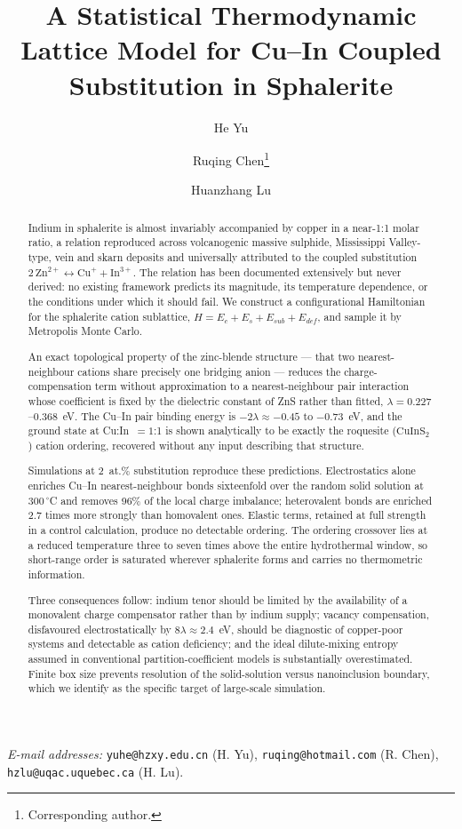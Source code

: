 \documentclass[11pt,a4paper]{article}
\title{\bfseries A Statistical Thermodynamic Lattice Model for
Cu--In Coupled Substitution in Sphalerite}
\author[1]{He Yu}
\author[2]{Ruqing Chen\thanks{Corresponding author.}}
\author[3]{Huanzhang Lu}
\affil[1]{Geological Laboratory, Hezhou University, Hezhou, Guangxi 542899, China}
\affil[2]{GUT Geoservice Inc., Montreal, Quebec, Canada}
\affil[3]{D\'epartement des sciences appliqu\'ees et Centre d'\'etudes sur les
ressources min\'erales, Universit\'e du Qu\'ebec \`a Chicoutimi, Quebec, Canada}
\date{}
\begin{document}
\maketitle

\noindent\small
\textit{E-mail addresses:} \texttt{yuhe@hzxy.edu.cn} (H. Yu),
\texttt{ruqing@hotmail.com} (R. Chen), \texttt{hzlu@uqac.uquebec.ca} (H. Lu).
\normalsize


\begin{abstract}
\noindent
Indium in sphalerite is almost invariably accompanied by copper in a near-1:1
molar ratio, a relation reproduced across volcanogenic massive sulphide,
Mississippi Valley-type, vein and skarn deposits and universally attributed to
the coupled substitution
$2\,\mathrm{Zn^{2+}} \leftrightarrow \mathrm{Cu^{+}} + \mathrm{In^{3+}}$. The
relation has been documented extensively but never derived: no existing
framework predicts its magnitude, its temperature dependence, or the conditions
under which it should fail. We construct a configurational Hamiltonian for the
sphalerite cation sublattice, $H = E_c + E_s + E_{sub} + E_{def}$, and sample it
by Metropolis Monte Carlo.

An exact topological property of the zinc-blende structure --- that two
nearest-neighbour cations share precisely one bridging anion --- reduces the
charge-compensation term without approximation to a nearest-neighbour pair
interaction whose coefficient is fixed by the dielectric constant of ZnS rather
than fitted, $\lambda = 0.227$--$0.368$~eV. The Cu--In pair binding energy is
$-2\lambda \approx -0.45$ to $-0.73$~eV, and the ground state at Cu:In~$=1$:1 is
shown analytically to be exactly the roquesite ($\mathrm{CuInS_2}$) cation
ordering, recovered without any input describing that structure.

Simulations at 2~at.\% substitution reproduce these predictions. Electrostatics
alone enriches Cu--In nearest-neighbour bonds sixteenfold over the random solid
solution at $300\,^\circ$C and removes 96\% of the local charge imbalance;
heterovalent bonds are enriched 2.7 times more strongly than homovalent ones.
Elastic terms, retained at full strength in a control calculation, produce no
detectable ordering. The ordering crossover lies at a reduced temperature three
to seven times above the entire hydrothermal window, so short-range order is
saturated wherever sphalerite forms and carries no thermometric information.

Three consequences follow: indium tenor should be limited by the availability of
a monovalent charge compensator rather than by indium supply; vacancy
compensation, disfavoured electrostatically by $8\lambda \approx 2.4$~eV, should
be diagnostic of copper-poor systems and detectable as cation deficiency; and
the ideal dilute-mixing entropy assumed in conventional partition-coefficient
models is substantially overestimated. Finite box size prevents resolution of
the solid-solution versus nanoinclusion boundary, which we identify as the
specific target of large-scale simulation.


\end{abstract}
\end{document}
